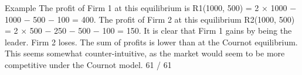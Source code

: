 Example
The profit of Firm 1 at this equilibrium is
R1(1000, 500) = 2 × 1000 − 1000 − 500 − 100 = 400.
The profit of Firm 2 at this equilibrium
R2(1000, 500) = 2 × 500 − 250 − 500 − 100 = 150.
It is clear that Firm 1 gains by being the leader. Firm 2 loses. The
sum of profits is lower than at the Cournot equilibrium.
This seems somewhat counter-intuitive, as the market would seem
to be more competitive under the Cournot model.
61 / 61


